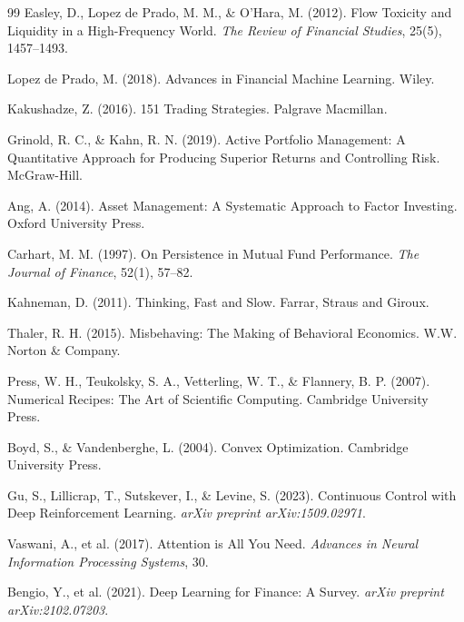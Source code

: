 \documentclass[11pt,letterpaper,openany]{book}
\begin{document}
\begin{thebibliography}{99}
 Easley, D., Lopez de Prado, M. M., \& O'Hara, M. (2012). Flow Toxicity and Liquidity in a High-Frequency World. \textit{The Review of Financial Studies}, 25(5), 1457--1493.

 Lopez de Prado, M. (2018). Advances in Financial Machine Learning. Wiley.

 Kakushadze, Z. (2016). 151 Trading Strategies. Palgrave Macmillan.

 Grinold, R. C., \& Kahn, R. N. (2019). Active Portfolio Management: A Quantitative Approach for Producing Superior Returns and Controlling Risk. McGraw-Hill.

 Ang, A. (2014). Asset Management: A Systematic Approach to Factor Investing. Oxford University Press.

 Carhart, M. M. (1997). On Persistence in Mutual Fund Performance. \textit{The Journal of Finance}, 52(1), 57--82.

 Kahneman, D. (2011). Thinking, Fast and Slow. Farrar, Straus and Giroux.

 Thaler, R. H. (2015). Misbehaving: The Making of Behavioral Economics. W.W. Norton \& Company.

 Press, W. H., Teukolsky, S. A., Vetterling, W. T., \& Flannery, B. P. (2007). Numerical Recipes: The Art of Scientific Computing. Cambridge University Press.

 Boyd, S., \& Vandenberghe, L. (2004). Convex Optimization. Cambridge University Press.

 Gu, S., Lillicrap, T., Sutskever, I., \& Levine, S. (2023). Continuous Control with Deep Reinforcement Learning. \textit{arXiv preprint arXiv:1509.02971}.

 Vaswani, A., et al. (2017). Attention is All You Need. \textit{Advances in Neural Information Processing Systems}, 30.

 Bengio, Y., et al. (2021). Deep Learning for Finance: A Survey. \textit{arXiv preprint arXiv:2102.07203}.

\end{thebibliography}

\end{document}
